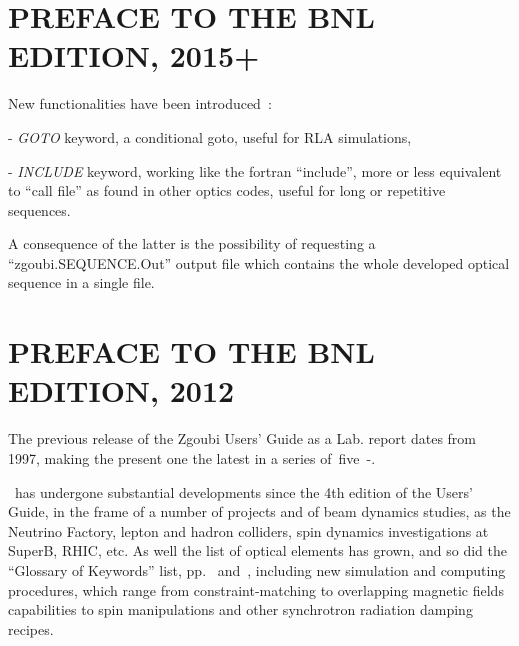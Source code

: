 
      \pagestyle{headings}


                                  \section*{PREFACE TO THE BNL EDITION, 2015+ } %

New functionalities have been introduced~: 

- \textsl{GOTO} keyword, a conditional goto, useful for RLA simulations, 

- \textsl{INCLUDE} keyword, working like the fortran ``include'', 
more or less equivalent to ``call file'' as found in other optics codes, useful for long or repetitive sequences. 

A consequence of the latter is the possibility of requesting  a ``zgoubi.SEQUENCE.Out'' output file which 
contains the whole  developed optical sequence in a single file. 


\newpage

                                  \section*{PREFACE TO THE BNL EDITION, 2012} 

The previous release of the Zgoubi Users' Guide as a Lab. report dates from 1997, making the present one  the 
latest in a series of~five~\cite{Biblio1}-\cite{Biblio2c}. 

\bigskip

\noindent \zgoubi\ has undergone substantial developments since the 
4th edition of the Users' Guide,  in the frame of a number of 
projects and of beam dynamics studies, as the Neutrino Factory, lepton and hadron colliders, 
spin dynamics investigations at SuperB, RHIC, etc. 
As well  the list of optical elements has grown, 
and so did the  ``Glossary of Keywords'' list, pp.~\pageref{GOK1A} and~\pageref{GOK1B}, including  new 
simulation and computing procedures, which range from constraint-matching to overlapping magnetic fields capabilities to 
spin manipulations  and other synchrotron radiation damping recipes. 

